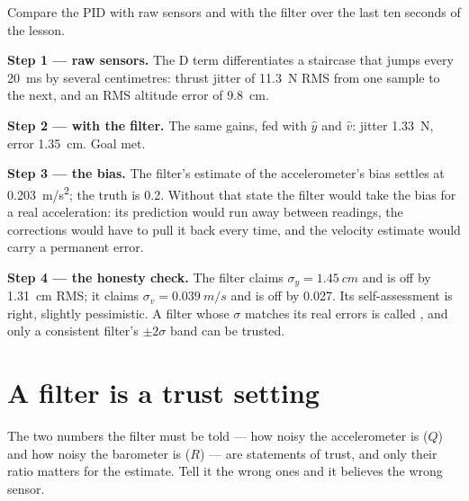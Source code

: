 \begin{example}
\label{ex:kalman-buys}
Compare the PID with raw sensors and with the filter over the last ten seconds of the lesson.

\textbf{Step 1 — raw sensors.} The D term differentiates a staircase that jumps every \SI{20}{ms} by several centimetres: thrust jitter of \SI{11.3}{N} RMS from one sample to the next, and an RMS altitude error of \SI{9.8}{cm}.

\textbf{Step 2 — with the filter.} The same gains, fed with $\hat y$ and $\hat v$: jitter \SI{1.33}{N}, error \SI{1.35}{cm}. Goal met.

\textbf{Step 3 — the bias.} The filter's estimate of the accelerometer's bias settles at \SI{0.203}{m/s^2}; the truth is 0.2. Without that state the filter would take the bias for a real acceleration: its prediction would run away between readings, the corrections would have to pull it back every time, and the velocity estimate would carry a permanent error.

\textbf{Step 4 — the honesty check.} The filter claims $\sigma_y = \SI{1.45}{cm}$ and is off by \SI{1.31}{cm} RMS; it claims $\sigma_v = \SI{0.039}{m/s}$ and is off by 0.027. Its self-assessment is right, slightly pessimistic. A filter whose $\sigma$ matches its real errors is called , and only a consistent filter's $\pm2\sigma$ band can be trusted.
\end{example}

\section{A filter is a trust setting}

The two numbers the filter must be told — how noisy the accelerometer is ($Q$) and how noisy the barometer is ($R$) — are statements of trust, and only their ratio matters for the estimate. Tell it the wrong ones and it believes the wrong sensor.


